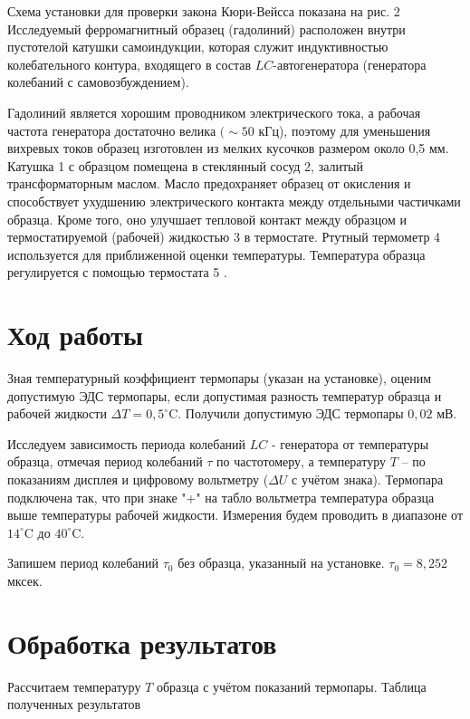 \documentclass[a4paper, 12pt]{article}%
\begin{document}
Схема установки для проверки закона Кюри-Вейсса показана на рис. 2 Исследуемый ферромагнитный образец (гадолиний) расположен внутри пустотелой катушки самоиндукции, которая служит индуктивностью колебательного контура, входящего в состав $L C$-автогенератора (генератора колебаний с самовозбуждением).

Гадолиний является хорошим проводником электрического тока, а рабочая частота генератора достаточно велика $(\sim 50$ кГц), поэтому для уменьшения вихревых токов образец изготовлен из мелких кусочков размером около 0,5 мм. Катушка 1 с образцом помещена в стеклянный сосуд 2, залитый трансформаторным маслом. Масло предохраняет образец от окисления и способствует ухудшению электрического контакта между отдельными частичками образца. Кроме того, оно улучшает тепловой контакт между образцом и термостатируемой (рабочей) жидкостью 3 в термостате. Ртутный термометр 4 используется для приближенной оценки температуры. Температура образца регулируется с помощью термостата 5 .


\section{Ход работы}

Зная температурный коэффициент термопары (указан на установке), оценим допустимую ЭДС термопары, если допустимая разность температур образца и рабочей жидкости $\Delta T=0,5^{\circ} \mathrm{C}$. Получили допустимую ЭДС термопары $0,02$ мВ.

Исследуем зависимость периода колебаний $LC$ - генератора от температуры образца, отмечая период колебаний $\tau$ по частотомеру, а температуру $T$ -- по показаниям дисплея и цифровому вольтметру ($\Delta U$ с учётом знака). Термопара подключена так, что при знаке "+" на табло вольтметра температура образца выше температуры рабочей жидкости.
Измерения будем проводить в диапазоне от $14^{\circ} \mathrm{C}$ до $40^{\circ} \mathrm{C}$.

Запишем период колебаний $\tau_{0}$ без образца, указанный на установке. $\tau_{0} = 8,252$ мксек.

\section{Обработка результатов}

Рассчитаем температуру $T$ образца с учётом показаний термопары. Таблица полученных результатов
\end{document}
